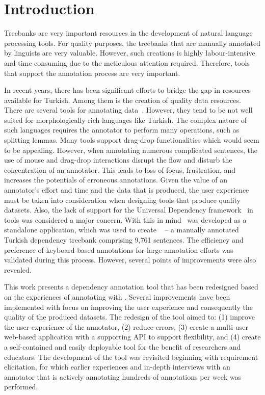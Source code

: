 \section{Introduction}
\label{sec:introduction}

Treebanks are very important resources in the development of natural language processing tools.
For quality purposes, the treebanks that are manually annotated by linguists are very valuable. 
However, such creations is highly labour-intensive and time consuming due to the meticulous attention required.
Therefore, tools that support the annotation process are very important. 

In recent years, there has been significant efforts to bridge the gap in resources available for Turkish. 
Among them is the creation of quality data resources. 
There are several tools for annotating data~\cite{brat,dgannotator}. 
However, they tend to be not well suited for morphologically rich languages like Turkish.
The complex nature of such languages requires the annotator to perform many operations, such as splitting lemmas.
Many tools support drag-drop functionalities which would seem to be appealing. 
However, when annotating numerous complicated sentences, the use of mouse and drag-drop interactions disrupt the flow and disturb the concentration of an annotator. 
This leads to loss of focus, frustration, and increases the potentials of erroneous annotations.
Given the value of an annotator's effort and time and the data that is produced, the user experience must be taken into consideration when designing tools that produce quality datasets. 
Also, the lack of support for the Universal Dependency framework~\cite{UD-main} in tools was considered a major concern.
With this in mind \boatvone\ was developed as a standalone application, which was used to create \bountreebank~\cite{turk-etal-2019-turkish,trk2020resources,UD-Boun-Treebank} -- a manually annotated Turkish dependency treebank comprising 9,761 sentences.
The efficiency and preference of keyboard-based annotations for large annotation efforts was validated during this process. 
However, several points of improvements were also revealed.  

This work presents a dependency annotation tool that has been redesigned based on the experiences of annotating with \boatvone.
Several improvements have been implemented with focus on improving the user experience and consequently the quality of the produced datasets.
The redesign of the tool aimed to: (1) improve the user-experience of the annotator, (2) reduce errors, (3) create a multi-user web-based application with a supporting API to support flexibility, and (4) create a self-contained and easily deployable tool for the benefit of researchers and educators. 
The development of the tool was revisited beginning with requirement elicitation, for which earlier experiences and in-depth interviews with an annotator that is actively annotating hundreds of annotations per week was performed. 

